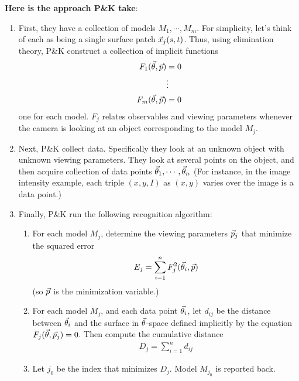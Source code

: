 \begin{example}
\begin{itemize}
  \textbf{Here is the approach P\&K take}:
  \begin{enumerate}
  \item First, they have a collection of models $M_1, \cdots,
    M_m$. For simplicity, let's think of each as being a single
    surface patch $\vec{x}_j(s, t)$. Thus, using elimination theory,
    P\&K construct a collection of implicit functions
    \begin{align*}
      F_1(\vec{\theta}, \vec{p}) &= 0 \\
                            &\vdots \\
      F_m(\vec{\theta}, \vec{p}) &= 0
    \end{align*}
    one for each model. $F_j$ relates observables and viewing
    parameters whenever the camera is looking at an object
    corresponding to the model $M_j$.
  \item Next, P\&K collect data. Specifically they look at an unknown
    object with unknown viewing parameters. They look at several
    points on the object, and then acquire collection of data points
    $\vec{\theta}_1, \cdots, \vec{\theta}_n$ (For instance, in the image
    intensity example, each triple $(x, y, I)$ as $(x, y)$ varies over
    the image is a data point.)
  \item Finally, P\&K run the following recognition algorithm:
    \begin{enumerate}
    \item For each model $M_j$, determine the viewing parameters
      $\vec{p}_j$ that minimize the squared error
      \begin{align*}
        E_j = \sum_{i=1}^n F_j^2(\vec{\theta}_i, \vec{p})
      \end{align*}
      (so $\vec{p}$ is the minimization variable.)
    \item For each model $M_j$, and each data point $\vec{\theta}_i$, let
      $d_{ij}$ be the distance between $\vec{\theta}_i$ and the surface
      in $\vec{\theta}$-space defined implicitly by the equation
      $F_j(\vec{\theta}, \vec{p}_j) = 0$. Then compute the cumulative
      distance
      \begin{align*}
        D_j = \sum_{i=1}^n d_{ij}
      \end{align*}
    \item Let $j_0$ be the index that minimizes $D_j$. Model $M_{j_0}$
      is reported back.
    \end{enumerate}
  \end{enumerate}
  \end{itemize}
\end{example}

